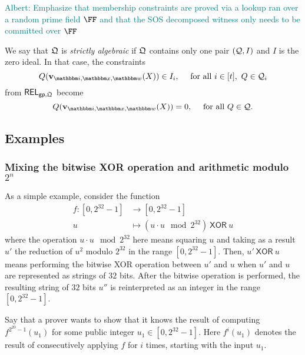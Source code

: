 \documentclass[11pt,letterpaper,usenames,dvipsnames]{article}
\newcommand{\albert}[1]{\textcolor{teal}{Albert: {#1}}}
\begin{document}
  \begin{remark}
      \albert{Emphasize that membership constraints are proved via a lookup ran over a random prime field $\FF$ and that the SOS decomposed witness only needs to be committed over $\FF$}
  \end{remark}

  \begin{definition}\label{d: strictly_algebraic} We say that  $\mathfrak{Q}$ is \emph{strictly algebraic} if $\mathfrak{Q}$ contains only one pair $(\mathcal{Q}, I)$ and $I$ is the zero ideal.  In that case,  the constraints $$Q(\vv_{\idx, \inp,\wit}(X))\in I_i, \quad \text{ for all } i\in [t],\ Q\in \cQ_i$$ from $\mathsf{REL}_{\mathsf{gp},\mathfrak{Q}}$ become $$Q(\vv_{\idx, \inp,\wit}(X))=0, \quad  \text{ for all }Q\in \cQ.$$
  \end{definition}
  
\subsection{Examples}
\label{sec:example-sha}

\subsubsection{Mixing the bitwise XOR operation and arithmetic modulo $2^n$}

\newcommand{\and}{\ \mathsf{AND}\ }
\newcommand{\xor}{\ \mathsf{XOR}\ }
\newcommand{\eq}{\mathsf{eq}}

As a simple example, consider the function 
%
\begin{align*}
f: [0, 2^{32}-1] &\to [0, 2^{32}-1]\\
u &\mapsto (u\cdot u \mod 2^{32}) \xor u
\end{align*}
%
where the operation $u\cdot u \mod 2^{32}$ here means squaring $u$ and taking as a result $u'$ the reduction of $u^2$ modulo $2^{32}$ in the range $[0,2^{32}-1]$. Then,  $u'\xor u$ means performing the bitwise XOR operation between $u'$ and $u$ when $u'$ and $u$ are represented as strings of $32$ bits. After the bitwise operation is performed, the resulting string of $32$ bits $u''$ is reinterpreted as an integer in the range $[0, 2^{32}-1]$. 

Say that a prover wants to show that it knows the result of computing $f^{2^{20}-1}(u_1)$ for some public integer $u_1\in [0, 2^{32}-1]$. Here $f^{i}(u_1)$ denotes the result of consecutively applying $f$ for $i$ times, starting with the input $u_1$. 
\end{document}
